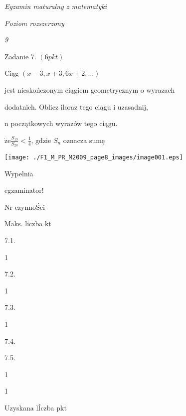 \documentclass[a4paper,12pt]{article}
\begin{document}
{\it Egzamin maturalny z matematyki}

{\it Poziom rozszerzony}

{\it 9}

Zadanie 7. $(6pkt)$

Ciąg $(x-3,x+3,6x+2,\ldots)$

jest nieskończonym ciągiem geometrycznym o wyrazach

dodatnich. Oblicz iloraz tego ciągu i uzasadnij,

n początkowych wyrazów tego ciągu.

$\dot{\mathrm{z}}\mathrm{e} \displaystyle \frac{S_{19}}{S_{20}}<\frac{1}{4}$, gdzie $S_{n}$ oznacza sumę
\begin{center}
\texttt{[image: ./F1\_M\_PR\_M2009\_page8\_images/image001.eps]}
\end{center}
Wypelnia

egzaminator!

Nr czynnoŚci

Maks. liczba kt

7.1.

1

7.2.

1

7.3.

1

7.4.

7.5.

1

1

Uzyskana lÍczba pkt
\end{document}
